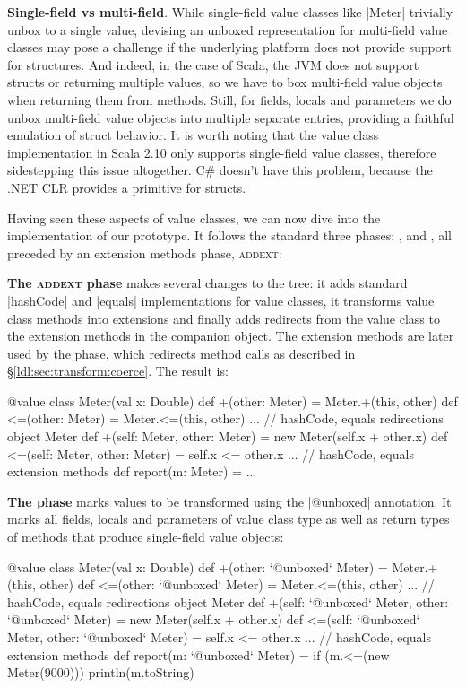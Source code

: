 \textbf{Single-field vs multi-field}. While single-field value clas\-ses like |Meter| trivially unbox to a single value, devising an unboxed representation for multi-field value classes may pose a challenge if the underlying platform does not provide support for structures. And indeed, in the case of Scala, the JVM does not support structs or returning multiple values, so we have to box multi-field value objects when returning them from methods. Still, for fields, locals and parameters we do unbox multi-field value objects into multiple separate entries, providing a faithful emulation of struct behavior. It is worth noting that the value class implementation in Scala 2.10 only supports single-field value classes, therefore sidestepping this issue altogether. C\# doesn't have this problem, because the .NET CLR provides a primitive for structs.

Having seen these aspects of value classes, we can now dive into the implementation of our prototype. It follows the standard three phases: \inject{}, \coerce{} and \commit{}, all preceded by an extension methods phase, \textsc{addext}:

\textbf{The \textsc{addext} phase} makes several changes to the tree: it adds standard |hashCode| and |equals| implementations for value classes, it transforms value class methods into extensions and finally adds redirects from the value class to the extension methods in the companion object. The extension methods are later used by the \coerce{} phase, which redirects method calls as described in \S\ref{ldl:sec:transform:coerce}. The result is:

\begin{lstlisting-nobreak}
 @value class Meter(val x: Double) {
   def +(other: Meter) = Meter.+(this, other)
   def <=(other: Meter) = Meter.<=(this, other)
   ... // hashCode, equals redirections
 }
 object Meter {
   def +(self: Meter, other: Meter) =
     new Meter(self.x + other.x)
   def <=(self: Meter, other: Meter) =
     self.x <= other.x
   ... // hashCode, equals extension methods
 }
 def report(m: Meter) = ...
\end{lstlisting-nobreak}

\textbf{The \inject{} phase} marks values to be transformed using the |@unboxed| annotation. It marks all fields, locals and parameters of value class type as well as return types of methods that produce single-field value objects:

\begin{lstlisting-nobreak}
 @value class Meter(val x: Double) {
   def +(other: `@unboxed` Meter) =
     Meter.+(this, other)
   def <=(other: `@unboxed` Meter) =
     Meter.<=(this, other)
   ... // hashCode, equals redirections
 }
 object Meter {
   def +(self: `@unboxed` Meter, other: `@unboxed` Meter) = new Meter(self.x + other.x)
   def <=(self: `@unboxed` Meter, other: `@unboxed` Meter) = self.x <= other.x
   ... // hashCode, equals extension methods
 }
 def report(m: `@unboxed` Meter) = {
   if (m.<=(new Meter(9000)))
     println(m.toString)
 }
\end{lstlisting-nobreak}

